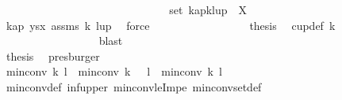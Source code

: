 \begin{isabellebody}
\ \ \ \ \ \ \ \ \ \ \ \ \ \ \isamarkupfalse%
\isanewline
\ \ \ \ \ \ \ \ \ \ \ \ \ \ \isamarkupfalse%
\ {\isachardoublequoteopen}set\ {\isacharparenleft}{\kern0pt}kap{\isacharbang}{\kern0pt}{\isacharparenleft}{\kern0pt}k{\isacharminus}{\kern0pt}{}{\isacharparenright}{\kern0pt}{\isacharhash}{\kern0pt}lup{\isacharparenright}{\kern0pt}\ {\isasymsubseteq}\ X{\isachardoublequoteclose}\ \isanewline
\ \ \ \ \ \ \ \ \ \ \ \ \ \ \ \ \isamarkupfalse%
\ kap{\isacharparenleft}{\kern0pt}{}{\isacharparenright}{\kern0pt}\ ysx\ assms{\isacharparenleft}{\kern0pt}{}{\isacharparenright}{\kern0pt}\ k{}\ lup{\isacharparenleft}{\kern0pt}{}{\isacharparenright}{\kern0pt}\ \isamarkupfalse%
\ force\isanewline
\ \ \ \ \ \ \ \ \ \ \ \ \ \ \isamarkupfalse%
\ \isamarkupfalse%
\ {\isacharquery}{\kern0pt}thesis\ \isamarkupfalse%
\ cup{\isacharunderscore}{\kern0pt}def\ k{}\ \isanewline
\ \ \ \ \ \ \ \ \ \ \ \ \ \ \ \ \isamarkupfalse%
\ blast\isanewline
\ \ \ \ \ \ \ \ \ \ \ \ \isamarkupfalse%
\isanewline
\ \ \ \ \ \ \ \ \ \ \isamarkupfalse%
\isanewline
\ \ \ \ \ \ \ \ \isamarkupfalse%
\isanewline
\ \ \ \ \ \ \isakeywordONE{{\isacharbraceright}{\kern0pt}}\isamarkupfalse%
\ \isanewline
\ \ \ \ \ \ \isamarkupfalse%
\ {\isacharquery}{\kern0pt}thesis\ \isamarkupfalse%
\ presburger\ \ \isanewline
\ \ \ \ \isamarkupfalse%
\isanewline
\ \ \isamarkupfalse%
\isanewline
\ \ \isamarkupfalse%
\ {\isachardoublequoteopen}min{\isacharunderscore}{\kern0pt}conv\ k\ l\ {\isasymle}\ min{\isacharunderscore}{\kern0pt}conv\ {\isacharparenleft}{\kern0pt}k\ {\isacharminus}{\kern0pt}\ {}{\isacharparenright}{\kern0pt}\ l\ {\isacharplus}{\kern0pt}\ min{\isacharunderscore}{\kern0pt}conv\ k\ {\isacharparenleft}{\kern0pt}l\ {\isacharminus}{\kern0pt}\ {}{\isacharparenright}{\kern0pt}\ {\isacharminus}{\kern0pt}\ {}{\isachardoublequoteclose}\isanewline
\ \ \ \ \isamarkupfalse%
\ min{\isacharunderscore}{\kern0pt}conv{\isacharunderscore}{\kern0pt}def\ inf{\isacharunderscore}{\kern0pt}upper\ min{\isacharunderscore}{\kern0pt}conv{\isacharunderscore}{\kern0pt}leImpe\ min{\isacharunderscore}{\kern0pt}conv{\isacharunderscore}{\kern0pt}set{\isacharunderscore}{\kern0pt}def\ \isamarkupfalse%

\end{isabellebody}
